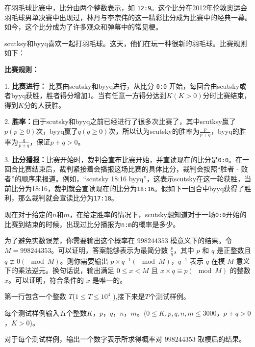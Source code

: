 
在羽毛球比赛中，比分由两个整数表示，如 \verb|12:9|。这个比分在2012年伦敦奥运会羽毛球男单决赛中出现过，林丹与李宗伟的这一精彩比分成为比赛中的经典一幕。如今，这个比分成为了许多观众和弹幕中的常见梗。

scutksy和byyq喜欢一起打羽毛球。这天，他们在玩一种很新的羽毛球。比赛规则如下：

\textbf{ 比赛规则：}

1. \textbf{比赛进行：}
   比赛由scutsky和byyq进行，从比分 \verb|0:0| 开始，每回合由scutsky或者byyq获胜，胜者得分增加1。当有任意一方得分达到$K(K>0)$分时比赛结束，得到$K$分的人获胜。

2. \textbf{胜率：}由于scutsky和byyq之前已经进行了很多次比赛了，其中scutksy赢了$p(p \geqslant 0)$次，byyq赢了$q(q \geqslant 0)$次，所以认为scutsky的胜率为$\frac{p}{p+q}$，byyq的胜率为$\frac{q}{p+q}$，保证$p+q>0$。

3. \textbf{比分播报：}比赛开始时，裁判会宣布比赛开始，并宣读现在的比分是\verb|0:0|。在一回合比赛结束后，裁判紧接着会播报这场比赛的具体比分，裁判会按照“胜者 - 败者”的顺序来报道。例如，“scutsky 18:16 byyq”，这表示scutsky在这一轮获胜，当前比分为18:16，裁判就会宣读现在的比分为\verb|18:16|。假如下一回合中byyq获得了胜利，那么裁判就会宣读比分为\verb|17:18|。

现在对于给定的$n$和$m$，在给定胜率的情况下，scutsky想知道对于一场\verb|0:0|开始的比赛到结束的时候，出现过比分播报为\verb|n:m|的概率是多少。

为了避免实数误差，你需要输出这个概率在 $998244353$ 模意义下的结果。令 $M = 998244353$。可以证明，答案能够表示为最简分数 $\frac{p}{q}$，其中 $p$ 和 $q$ 是正整数且 $q \not \equiv 0 (\mod M)$。则你需要输出 $p \times q^{-1}(\mod M)$，$q^{-1}$ 表示 $q$ 在模 $M$ 意义下的乘法逆元。换句话说，输出满足 $0 \leqslant x < M$ 且 $x \times q  \equiv  p (\mod M)$ 的整数 $x$。可以证明，符合条件的 $x$ 是唯一的。


第一行包含一个整数 $T$($1 \leqslant T \leqslant 10^4$ ),接下来是$T$个测试样例。

每个测试样例输入五个整数$K$，$p$，$q$，$n$，$m$。($0\leqslant K,p,q,n,m\leqslant 3000$，$p+q>0$，$K>0$)。


对于每个测试样例，输出一个数字表示所求得概率对 $998244353$ 取模后的结果。


